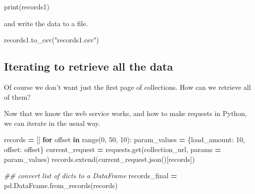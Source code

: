\documentclass[
]{book}
\newenvironment{Shaded}{\begin{snugshade}}{\end{snugshade}}
\newcommand{\BuiltInTok}[1]{#1}
\newcommand{\CommentTok}[1]{\textcolor[rgb]{0.56,0.35,0.01}{\textit{#1}}}
\newcommand{\ControlFlowTok}[1]{\textcolor[rgb]{0.13,0.29,0.53}{\textbf{#1}}}
\newcommand{\DecValTok}[1]{\textcolor[rgb]{0.00,0.00,0.81}{#1}}
\newcommand{\KeywordTok}[1]{\textcolor[rgb]{0.13,0.29,0.53}{\textbf{#1}}}
\newcommand{\NormalTok}[1]{#1}
\newcommand{\OperatorTok}[1]{\textcolor[rgb]{0.81,0.36,0.00}{\textbf{#1}}}
\newcommand{\StringTok}[1]{\textcolor[rgb]{0.31,0.60,0.02}{#1}}
\begin{document}
\begin{Shaded}
\begin{Highlighting}[]
\BuiltInTok{print}\NormalTok{(records1)}
\end{Highlighting}
\end{Shaded}

and write the data to a file.

\begin{Shaded}
\begin{Highlighting}[]
\NormalTok{records1.to\_csv(}\StringTok{"records1.csv"}\NormalTok{)}
\end{Highlighting}
\end{Shaded}

\hypertarget{iterating-to-retrieve-all-the-data}{%
\subsection{Iterating to retrieve all the data}\label{iterating-to-retrieve-all-the-data}}

Of course we don't want just the first page of collections. How can we retrieve all of them?

Now that we know the web service works, and how to make requests in Python, we can iterate in the usual way.

\begin{Shaded}
\begin{Highlighting}[]
\NormalTok{records }\OperatorTok{=}\NormalTok{ []}
\ControlFlowTok{for}\NormalTok{ offset }\KeywordTok{in} \BuiltInTok{range}\NormalTok{(}\DecValTok{0}\NormalTok{, }\DecValTok{50}\NormalTok{, }\DecValTok{10}\NormalTok{):}
\NormalTok{    param\_values }\OperatorTok{=}\NormalTok{ \{}\StringTok{\textquotesingle{}load\_amount\textquotesingle{}}\NormalTok{: }\DecValTok{10}\NormalTok{, }\StringTok{\textquotesingle{}offset\textquotesingle{}}\NormalTok{: offset\}}
\NormalTok{    current\_request }\OperatorTok{=}\NormalTok{ requests.get(collection\_url, params }\OperatorTok{=}\NormalTok{ param\_values)}
\NormalTok{    records.extend(current\_request.json()[}\StringTok{\textquotesingle{}records\textquotesingle{}}\NormalTok{])}
\end{Highlighting}
\end{Shaded}

\begin{Shaded}
\begin{Highlighting}[]
\CommentTok{\#\# convert list of dicts to a \textasciigrave{}DataFrame\textasciigrave{}}
\NormalTok{records\_final }\OperatorTok{=}\NormalTok{ pd.DataFrame.from\_records(records)}
\end{Highlighting}
\end{Shaded}
\end{document}
